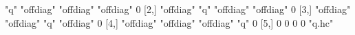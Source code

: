 \begin{Schunk}
\begin{Soutput}
     [,1]      [,2]      [,3]      [,4]      [,5]  
[1,] "q"       "offdiag" "offdiag" "offdiag" 0     
[2,] "offdiag" "q"       "offdiag" "offdiag" 0     
[3,] "offdiag" "offdiag" "q"       "offdiag" 0     
[4,] "offdiag" "offdiag" "offdiag" "q"       0     
[5,] 0         0         0         0         "q.hc"
\end{Soutput}
\end{Schunk}
